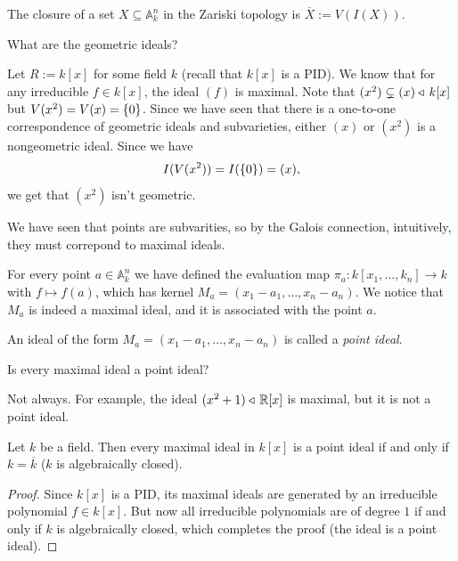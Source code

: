 \documentclass[11pt,a4paper]{article}
\newcommand{\A}{\mathbb A}
\begin{document}
\begin{remark}
  The closure of a set $X \subseteq \A_k^n$
  in the Zariski topology is $\overline X := V(I(X))$.
\end{remark}

\begin{question}
  What are the geometric ideals?
\end{question}

\begin{example}
  Let $R := k[x]$ for some field $k$ (recall that $k[x]$ is a PID).
  We know that for any irreducible $f \in k[x]$,
  the ideal $(f)$ is maximal.
  Note that $(x^2) \subsetneq (x) \triangleleft\, k[x]$
  but $V(x^2) = V(x) = \left\{0\right\}$.
  Since we have seen that there is a one-to-one correspondence of geometric
  ideals and subvarieties, either $(x)$ or $(x^2)$ is a nongeometric ideal.
  Since we have
  \[
    I(V(x^2)) = I(\left\{0\right\}) = (x),
  \]
  we get that $(x^2)$ isn't geometric.
\end{example}

\begin{remark}
  We have seen that points are subvarities,
  so by the Galois connection,
  intuitively, they must correpond to maximal ideals.
\end{remark}

\begin{remark}
  For every point $a \in \A_k^n$
  we have defined the evaluation map $\pi_a \colon k[x_1,\dots,k_n] \to k$
  with $f \mapsto f(a)$,
  which has kernel $M_a = (x_1 - a_1,\dots, x_n - a_n)$.
  We notice that $M_a$ is indeed a maximal ideal,
  and it is associated with the point $a$.

  An ideal of the form $M_a = (x_1 - a_1,\dots, x_n - a_n)$
  is called a \textit{point ideal}.
\end{remark}

\begin{question}
  Is every maximal ideal a point ideal?
\end{question}
\begin{answer}
  Not always.
  For example, the ideal $(x^2 + 1) \triangleleft\, \mathbb{R}[x]$ is maximal,
  but it is not a point ideal.
\end{answer}

\begin{lemma}
  Let $k$ be a field.
  Then every maximal ideal in $k[x]$ is a point ideal if and only if
  $k = \overline k$ ($k$ is algebraically closed).
\end{lemma}
\begin{proof}
  Since $k[x]$ is a PID, its maximal ideals are generated by an irreducible
  polynomial $f \in k[x]$.
   But now all irreducible polynomials are of degree $1$ if and only
   if $k$ is algebraically closed,
   which completes the proof (the ideal is a point ideal).
\end{proof}
\end{document}
